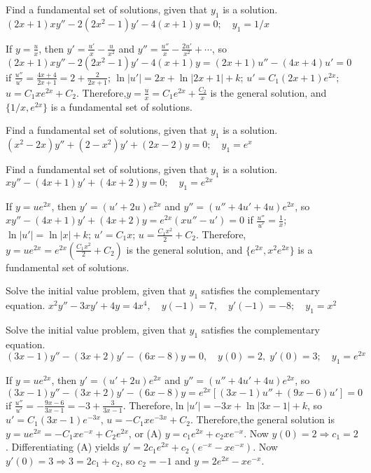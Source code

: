\documentclass{ximera}
\begin{document}
\begin{problem}\label{exer:5.6.28}
Find a
fundamental set of solutions, given that $y_1$ is a solution. $(2x+1)xy''-2(2x^2-1)y'-4(x+1)y=0;  \quad y_1=1/x$

\begin{solution}
    If $y=\frac{u}{ x}$, then $y'=\frac{u'}{ x}-\frac{u}{ x^2}$ and
$y''=\frac{u''}{ x}-\frac{2u'}{ x^2}+\cdots$, so
$(2x+1)xy''-2(2x^2-1)y'-4(x+1)y=(2x+1)u''-(4x+4)u'=0$ if
$\frac{u''}{ u'}=\frac{4x+4}{2x+1}=2+\frac{2}{2x+1}$;\;
$\ln|u'|=2x+\ln|2x+1|+k$; $u'=C_1(2x+1)e^{2x}$;\ $u=C_1xe^{2x}+C_2$.
Therefore,$y=\frac{u}{ x}=C_1e^{2x}+\frac{C_2}{ x}$ is the general
solution, and $\{1/x,e^{2x}\}$ is a fundamental set of solutions.

\end{solution}
\end{problem}

\begin{problem}\label{exer:5.6.29}
Find a
fundamental set of solutions, given that $y_1$ is a solution. $(x^2-2x)y''+(2-x^2)y'+(2x-2)y=0;  \quad y_1=e^x$
\end{problem}

\begin{problem}\label{exer:5.6.30}
Find a
fundamental set of solutions, given that $y_1$ is a solution. $xy''-(4x+1)y'+(4x+2)y=0;  \quad y_1=e^{2x}$

\begin{solution}
    If $y=ue^{2x}$, then $y'=(u'+2u)e^{2x}$ and $y''=(u''+4u'+4u)e^{2x}$,
so $xy''-(4x+1)y'+(4x+2)y =e^{2x}(xu''-u')=0$ if $\frac{u''}{
u'}=\frac{1}{ x}$;\ $\ln|u'|=\ln|x|+k$; $u'=C_1x$;\;
$u=\frac{C_1x^2}{ 2}+C_2$. Therefore,
$y=ue^{2x}=e^{2x}\left(\frac{C_1x^2}{2}+C_2\right)$ is the general
solution, and $\{e^{2x},x^2e^{2x}\}$ is a fundamental set of
solutions.
\end{solution}
\end{problem}

\begin{problem}\label{exer:5.6.31}
Solve the
initial value problem, given that $y_1$ satisfies the complementary
equation. $x^2y''-3xy'+4y=4x^4,\quad y(-1)=7,\quad  y'(-1)=-8;   \quad y_1=x^2$
\end{problem}

\begin{problem}\label{exer:5.6.32}
Solve the
initial value problem, given that $y_1$ satisfies the complementary
equation. $(3x-1)y''-(3x+2)y'-(6x-8)y=0, \quad   y(0)=2,\;  y'(0)=3;    \quad
y_1=e^{2x}$

\begin{solution}
    If $y=ue^{2x}$, then $y'=(u'+2u)e^{2x}$ and $y''=(u''+4u'+4u)e^{2x}$,
so
$(3x-1)y''-(3x+2)y'-(6x-8)y=e^{2x}\left[(3x-1)u''+(9x-6)u'\right]=0$
if $\frac{u''}{ u'}=-\frac{9x-6}{3x-1}=-3+\frac{3}{3x-1}$.
Therefore,$\ln|u'|=-3x+\ln|3x-1|+k$, so $u'=C_1(3x-1)e^{-3x}$,
$u=-C_1xe^{-3x}+C_2$. Therefore,the general solution is
$y=ue^{2x}=-C_1xe^{-x}+C_2e^{2x}$, or (A) $y=c_1e^{2x}+c_2xe^{-x}$.
Now $y(0)=2\Rightarrow c_1=2$. Differentiating (A) yields
$y'=2c_1e^{2x}+c_2(e^{-x}-xe^{-x})$. Now $y'(0)=3\Rightarrow
3=2c_1+c_2$, so $c_2=-1$ and $y=2e^{2x}-xe^{-x}$.
\end{solution}
\end{problem}
\end{document}
